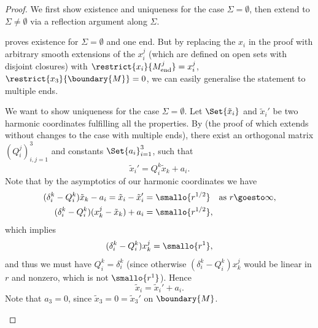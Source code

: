 \documentclass[titlepage,numbers=noenddot,oneside,%
cleardoublepage=empty,paper=a4,fontsize=11pt,%
english,%
]{scrartcl}
\newcommand{\Mend}{M_{\mathrm{end}}} %
\begin{document}
\begin{proof}
    We first show existence and uniqueness for the case \( \Sigma=\emptyset \), then extend to \( \Sigma\neq \emptyset \) via a reflection argument along \( \Sigma \).
 
    \begin{proofenumerate}[label=\textbf{Step \arabic*.}]
        \item \cite[Proposition 3.8]{almarazPositiveMassTheorem2016} proves existence for \( \Sigma=\emptyset \) and one end. But by replacing the \( x_i \) in the proof with arbitrary smooth extensions of the \( x_i^j \) (which are defined on open sets with disjoint closures) with \( \restrict{x_i}{\Mend^j}=x_i^j  \), \( \restrict{x_3}{\boundary{M}}=0 \), we can easily generalise the statement to multiple ends.


        
        We want to show uniqueness for the case \( \Sigma=\emptyset \). Let \( \Set{\tilde{x}_i} \) and \( \tilde{x}_i' \) be two harmonic coordinates fulfilling all the properties. By \cite[Proposition 3.9]{almarazPositiveMassTheorem2016} (the proof of which extends without changes to the case with multiple ends), there exist an orthogonal matrix \( (Q_{i}^j)_{i,j=1}^3 \) and constants \( \Set{a_i}_{i=1}^3 \), such that
        \begin{equation*}
            \tilde{x}_i'=Q_i^k\tilde{x}_k+a_i.
        \end{equation*}
        Note that by the asymptotics of our harmonic coordinates we have 
        \begin{align*}
            (\delta_i^k-Q_i^k)\tilde{x}_k-a_i=\tilde{x}_i-\tilde{x}_i'&=\smallo{r^{1/2}} \quad \text{as \( r\goesto \infty \)},\\
            (\delta_i^k-Q_i^k)(x_k^j-\tilde{x}_k)+a_i&=\smallo{r^{1/2}},
        \end{align*}
        which implies 
        \begin{equation*}
            (\delta_i^k-Q_i^k)x_k^j=\smallo{r^1},
        \end{equation*}
        and thus we must have \( Q_i^k=\delta_i^k \) (since otherwise \( (\delta_i^k-Q_i^k)x_k^j \) would be linear in \( r \) and nonzero, which is not \( \smallo{r^1} \)). Hence
        \begin{equation*}
            \tilde{x}_i=\tilde{x}_i'+a_i.
        \end{equation*} 
        Note that \( a_3=0 \), since \( \tilde{x}_3=0=\tilde{x}_3' \) on \( \boundary{M} \).


\end{proofenumerate}
\end{proof}
\end{document}
